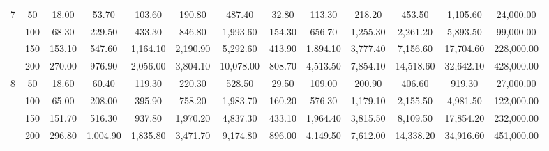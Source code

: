 \begin{table}[htbp]
\begin{adjustbox}{angle=90}
{\begin{tabular}{|c|c|c|c|c|c|c|c|c|c|c|c|c|}
    7 & 50 & 18.00 & 53.70 & 103.60 & 190.80 & 487.40 & 32.80 & 113.30 & 218.20 & 453.50 & 1,105.60                                         & 24,000.00 \\
     & 100 & 68.30 & 229.50 & 433.30 & 846.80 & 1,993.60 & 154.30 & 656.70 & 1,255.30 & 2,261.20 & 5,893.50                                 & 99,000.00 \\
     & 150 & 153.10 & 547.60 & 1,164.10 & 2,190.90 & 5,292.60 & 413.90 & 1,894.10 & 3,777.40 & 7,156.60 & 17,704.60                         & 228,000.00 \\
     & 200 & 270.00 & 976.90 & 2,056.00 & 3,804.10 & 10,078.00 & 808.70 & 4,513.50 & 7,854.10 & 14,518.60 & 32,642.10                       & 428,000.00 \\ \hline
    8 & 50 & 18.60 & 60.40 & 119.30 & 220.30 & 528.50 & 29.50 & 109.00 & 200.90 & 406.60 & 919.30                                           & 27,000.00 \\
     & 100 & 65.00 & 208.00 & 395.90 & 758.20 & 1,983.70 & 160.20 & 576.30 & 1,179.10 & 2,155.50 & 4,981.50                                 & 122,000.00 \\
     & 150 & 151.70 & 516.30 & 937.80 & 1,970.20 & 4,837.30 & 433.10 & 1,964.40 & 3,815.50 & 8,109.50 & 17,854.20                           & 232,000.00 \\
     & 200 & 296.80 & 1,004.90 & 1,835.80 & 3,471.70 & 9,174.80 & 896.00 & 4,149.50 & 7,612.00 & 14,338.20 & 34,916.60                      & 451,000.00 \\ \hline
    \end{tabular}}
    \end{adjustbox}
    \label{exp:literature_all_times}
    \end{table}
    